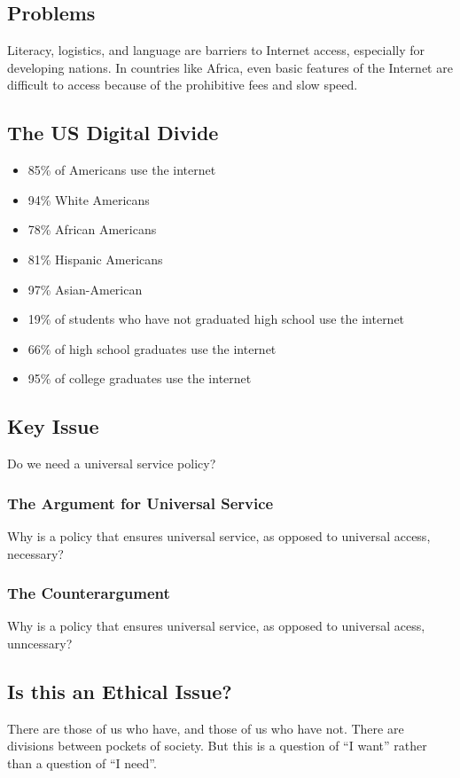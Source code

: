 \documentclass[letterpaper, 12pt]{article}
\begin{document}
\subsection*{Problems}
Literacy, logistics, and language are barriers to Internet access, especially
for developing nations. In countries like Africa, even basic features of the
Internet are difficult to access because of the prohibitive fees and slow
speed.

\subsection*{The US Digital Divide}
\begin{itemize}
  \item 85\% of Americans use the internet
  \item 94\% White Americans
  \item 78\% African Americans
  \item 81\% Hispanic Americans
  \item 97\% Asian-American
  \item 19\% of students who have not graduated high school use the internet
  \item 66\% of high school graduates use the internet
  \item 95\% of college graduates use the internet
\end{itemize}

\subsection*{Key Issue}
Do we need a universal service policy?

\subsubsection*{The Argument for Universal Service}
Why is a policy that ensures universal service, as opposed to universal access,
necessary?

\subsubsection*{The Counterargument}
Why is a policy that ensures universal service, as opposed to universal acess,
unncessary?

\subsection*{Is this an Ethical Issue?}
There are those of us who have, and those of us who have not. There are
divisions between pockets of society. But this is a question of ``I want''
rather than a question of ``I need''.
\end{document}
